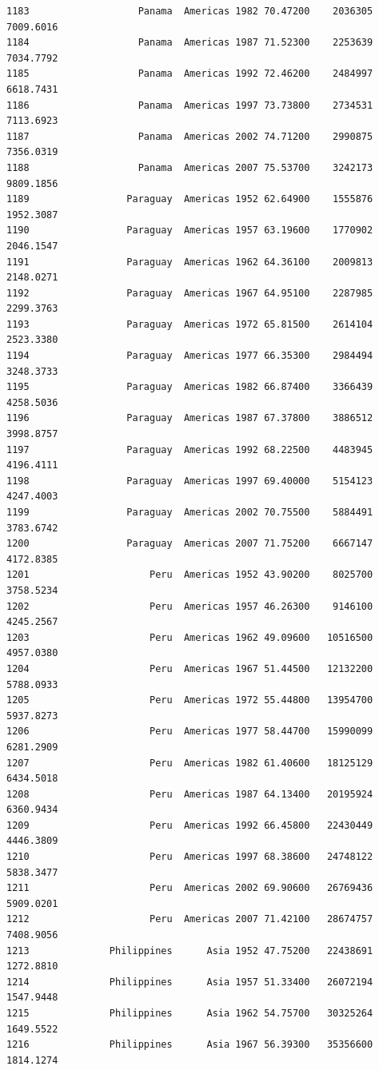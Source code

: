\documentclass[
  letterpaper,
  DIV=11,
  numbers=noendperiod]{scrreprt}
\begin{document}
\begin{verbatim}
1183                   Panama  Americas 1982 70.47200    2036305   7009.6016
1184                   Panama  Americas 1987 71.52300    2253639   7034.7792
1185                   Panama  Americas 1992 72.46200    2484997   6618.7431
1186                   Panama  Americas 1997 73.73800    2734531   7113.6923
1187                   Panama  Americas 2002 74.71200    2990875   7356.0319
1188                   Panama  Americas 2007 75.53700    3242173   9809.1856
1189                 Paraguay  Americas 1952 62.64900    1555876   1952.3087
1190                 Paraguay  Americas 1957 63.19600    1770902   2046.1547
1191                 Paraguay  Americas 1962 64.36100    2009813   2148.0271
1192                 Paraguay  Americas 1967 64.95100    2287985   2299.3763
1193                 Paraguay  Americas 1972 65.81500    2614104   2523.3380
1194                 Paraguay  Americas 1977 66.35300    2984494   3248.3733
1195                 Paraguay  Americas 1982 66.87400    3366439   4258.5036
1196                 Paraguay  Americas 1987 67.37800    3886512   3998.8757
1197                 Paraguay  Americas 1992 68.22500    4483945   4196.4111
1198                 Paraguay  Americas 1997 69.40000    5154123   4247.4003
1199                 Paraguay  Americas 2002 70.75500    5884491   3783.6742
1200                 Paraguay  Americas 2007 71.75200    6667147   4172.8385
1201                     Peru  Americas 1952 43.90200    8025700   3758.5234
1202                     Peru  Americas 1957 46.26300    9146100   4245.2567
1203                     Peru  Americas 1962 49.09600   10516500   4957.0380
1204                     Peru  Americas 1967 51.44500   12132200   5788.0933
1205                     Peru  Americas 1972 55.44800   13954700   5937.8273
1206                     Peru  Americas 1977 58.44700   15990099   6281.2909
1207                     Peru  Americas 1982 61.40600   18125129   6434.5018
1208                     Peru  Americas 1987 64.13400   20195924   6360.9434
1209                     Peru  Americas 1992 66.45800   22430449   4446.3809
1210                     Peru  Americas 1997 68.38600   24748122   5838.3477
1211                     Peru  Americas 2002 69.90600   26769436   5909.0201
1212                     Peru  Americas 2007 71.42100   28674757   7408.9056
1213              Philippines      Asia 1952 47.75200   22438691   1272.8810
1214              Philippines      Asia 1957 51.33400   26072194   1547.9448
1215              Philippines      Asia 1962 54.75700   30325264   1649.5522
1216              Philippines      Asia 1967 56.39300   35356600   1814.1274

\end{verbatim}
\end{document}
